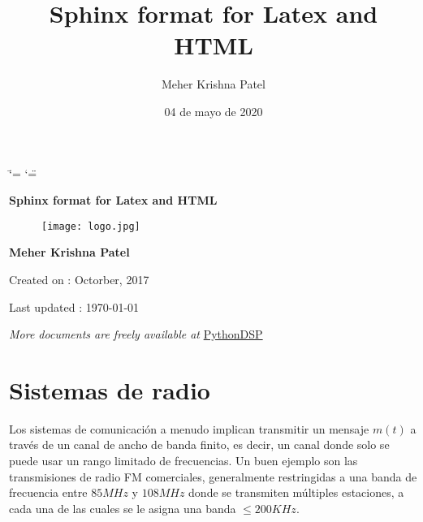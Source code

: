 \documentclass[a4paper,10pt,spanish]{report}
\title{Sphinx format for Latex and HTML}
\date{04 de mayo de 2020}
\author{Meher Krishna Patel}
\begin{document}
\ifdefined\shorthandoff
  \ifnum\catcode`\=\string=\active\shorthandoff{=}\fi
  \ifnum\catcode`\"=\active{}\fi
\fi

\pagestyle{empty}


        \begin{titlepage}
            \centering

            \vspace*{40mm} %
            \textbf{\Huge {Sphinx format for Latex and HTML}}

            \vspace{0mm}
            \begin{figure}[!h]
                \centering
                \texttt{[image: logo.jpg]}
            \end{figure}

            \vspace{0mm}
            \Large \textbf{{Meher Krishna Patel}}

            \small Created on : Octorber, 2017

            \vspace*{0mm}
            \small  Last updated : \MonthYearFormat\today


            \vfill
            \small \textit{More documents are freely available at }{\href{http://pythondsp.readthedocs.io/en/latest/pythondsp/toc.html}{PythonDSP}}
        \end{titlepage}

        \clearpage
        \tableofcontents
        \listoffigures
        \listoftables
        \clearpage

        
\pagestyle{plain}
 
\pagestyle{normal}
\label{\detokenize{index::doc}}



\chapter{Sistemas de radio}
\label{\detokenize{introduccion/sistemas:Sistemas-de-radio}}\label{\detokenize{introduccion/sistemas::doc}}
Los sistemas de comunicación a menudo implican transmitir un mensaje \(m(t)\) a través de un canal de ancho de banda finito, es decir, un canal donde solo se puede usar un rango limitado de frecuencias. Un buen ejemplo son las transmisiones de radio FM comerciales, generalmente restringidas a una banda de frecuencia entre \(85MHz\) y \(108MHz\) donde se transmiten múltiples estaciones, a cada una de las cuales se le asigna una banda \(\le 200 KHz\).
\end{document}
